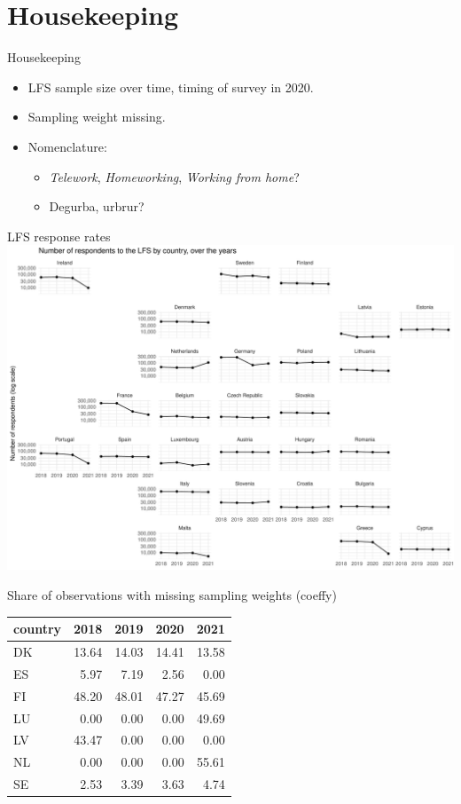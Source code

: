 \documentclass[10pt]{beamer}
\begin{document}
\section{Housekeeping}
\begin{frame}{Housekeeping}
\begin{itemize}
  \item LFS sample size over time, timing of survey in 2020.
  \item Sampling weight missing.
  \item Nomenclature:
    \begin{itemize}
      \item \emph{Telework}, \emph{Homeworking}, \emph{Working from home}?
      \item Degurba, urbrur?
    \end{itemize}
\end{itemize}
\end{frame}

\begin{frame}{LFS response rates}
\centering
\includegraphics[width=\textwidth,height=0.9\textheight,keepaspectratio]{LFS_respondents_time.pdf}
\end{frame}


\begin{frame}{Share of observations with missing sampling weights (coeffy)}
\centering
\begin{table}[ht]
\centering
\begin{tabular}{lrrrr}
  \hline
  country & 2018 & 2019 & 2020 & 2021 \\ 
  \hline
  DK & 13.64 & 14.03 & 14.41 & 13.58 \\ 
  ES & 5.97 & 7.19 & 2.56 & 0.00 \\ 
  FI & 48.20 & 48.01 & 47.27 & 45.69 \\ 
  LU & 0.00 & 0.00 & 0.00 & 49.69 \\ 
  LV & 43.47 & 0.00 & 0.00 & 0.00 \\ 
  NL & 0.00 & 0.00 & 0.00 & 55.61 \\ 
  SE & 2.53 & 3.39 & 3.63 & 4.74 \\ 
  \hline
\end{tabular}
\end{table}
\end{frame}
\end{document}

